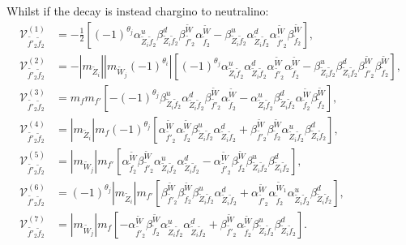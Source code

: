 \documentclass[final,3p,times]{elsarticle}
\begin{document}
Whilst if the decay is instead chargino to neutralino:
\begin{align}
\mathcal{V}_{\tilde{f'}_2 \tilde{f}_2}^{(1)} &=-\frac{1}{2}\left[(-1)^{\theta_j}\alpha_{\tilde{Z}_i \tilde{f}_2}^{u} \beta_{\tilde{Z}_i \tilde{f}_2}^{d} \beta_{\tilde{f'}_2}^{\tilde{W}}\alpha_{\tilde{f}_2}^{\tilde{W}} - \beta_{\tilde{Z}_i \tilde{f}_2}^{u} \alpha_{\tilde{Z}_i \tilde{f}_2}^{d} \alpha_{\tilde{f'}_2}^{\tilde{W}} \beta_{\tilde{f}_2}^{\tilde{W}}\right], \\
\mathcal{V}_{\tilde{f'}_2 \tilde{f}_2}^{(2)} &= -|m_{\tilde{Z}_i}||m_{\tilde{W}_j}(-1)^{\theta_i}|\left[(-1)^{\theta_j} \alpha_{\tilde{Z}_i \tilde{f}_2}^{u} \alpha_{\tilde{Z}_i \tilde{f}_2}^{d} \alpha_{\tilde{f'}_2}^{\tilde{W}} \alpha_{\tilde{f}_2}^{\tilde{W}} - \beta_{\tilde{Z}_i \tilde{f}_2}^{u} \beta_{\tilde{Z}_{i} \tilde{f}_2}^{d} \beta_{\tilde{f'}_2}^{\tilde{W}} \beta_{\tilde{f}_2}^{\tilde{W}}\right], \\
\mathcal{V}_{\tilde{f'}_2 \tilde{f}_2}^{(3)} &= m_{f}m_{f'}\left[-(-1)^{\theta_j}\beta_{\tilde{Z}_i \tilde{f}_2}^{u} \alpha_{\tilde{Z}_i \tilde{f}_2}^{d} \beta_{\tilde{f'}_2}^{\tilde{W}} \alpha_{\tilde{f}_2}^{\tilde{W}} -  \alpha_{\tilde{Z}_i \tilde{f}_2}^{u} \beta_{\tilde{Z}_i \tilde{f}_2}^{d} \alpha_{\tilde{f}_2}^{\tilde{W}} \beta_{\tilde{f}_2}^{\tilde{W}}\right], \\
\mathcal{V}_{\tilde{f'}_2 \tilde{f}_2}^{(4)} &= |m_{\tilde{Z}_i}| m_{f} (-1)^{\theta_j} \left[\alpha_{\tilde{f'}_2}^{\tilde{W}} \alpha_{\tilde{f}_2}^{\tilde{W}} \beta_{\tilde{Z}_i \tilde{f}_2}^{u} \alpha_{\tilde{Z}_i \tilde{f}_2}^{d} + \beta_{\tilde{f'}_2}^{\tilde{W}} \beta_{\tilde{f}_2}^{\tilde{W}} \alpha_{\tilde{Z}_i \tilde{f}_2}^{u} \beta_{\tilde{Z}_i \tilde{f}_2}^{d}\right] ,\\
\mathcal{V}_{\tilde{f'}_2 \tilde{f}_2}^{(5)} &= |m_{\tilde{W}_j}|m_{f'} \left[\alpha_{\tilde{f}_2}^{\tilde{W}} \beta_{\tilde{f'}_2}^{\tilde{W}} \alpha_{\tilde{Z}_i \tilde{f}_2}^{u} \alpha_{\tilde{Z}_i \tilde{f}_2}^{d} - \alpha_{\tilde{f'}_2}^{\tilde{W}} \beta_{\tilde{f}_2}^{\tilde{W}} \beta_{\tilde{Z}_i \tilde{f}_2}^{u} \beta_{\tilde{Z}_i \tilde{f}_2}^{d}\right],\\
\mathcal{V}_{\tilde{f'}_2 \tilde{f}_2}^{(6)} &= (-1)^{\theta_j}|m_{\tilde{Z}_i}| m_{f'}\left[\beta_{\tilde{f'}_2}^{\tilde{W}}\beta_{\tilde{f}_2}^{\tilde{W}} \beta_{\tilde{Z}_i \tilde{f}_2}^{u} \alpha_{\tilde{Z}_i \tilde{f}_2}^{d}  + \alpha_{\tilde{f'}_2}^{\tilde{W}} \alpha_{\tilde{f}_2}^{\tilde{W}_1} \alpha_{\tilde{Z}_i \tilde{f}_2}^{u} \beta_{\tilde{Z}_i \tilde{f}_2}^{d}\right], \\
\mathcal{V}_{\tilde{f'}_2 \tilde{f}_2}^{(7)} &= |m_{\tilde{W}_j}|m_{f}\left[-\alpha_{\tilde{f'}_2}^{\tilde{W}}\beta_{\tilde{f}_2}^{\tilde{W}} \alpha_{\tilde{Z}_i \tilde{f}_2}^{u} \alpha_{\tilde{Z}_i \tilde{f}_2}^{d} + \beta_{\tilde{f'}_2}^{\tilde{W}} \alpha_{\tilde{f}_2}^{\tilde{W}} \beta_{\tilde{Z}_i \tilde{f}_2}^{u} \beta_{\tilde{Z}_i \tilde{f}_2}^{d}\right].
\end{align}
\end{document}
